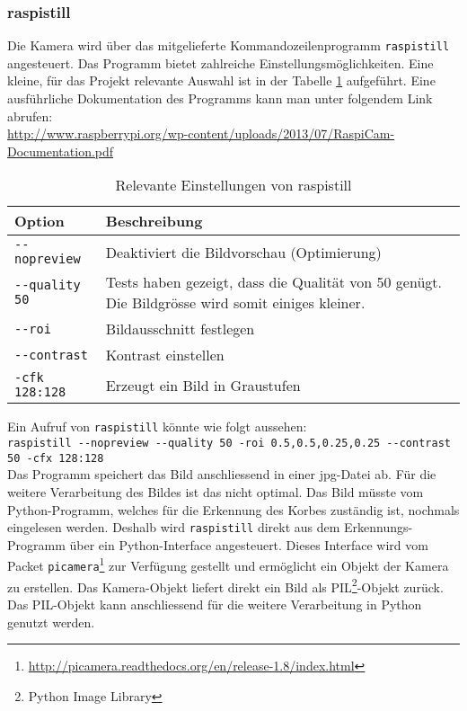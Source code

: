 \subsubsection{raspistill}
\label{subsub:raspistill}
Die Kamera wird über das mitgelieferte Kommandozeilenprogramm \verb|raspistill| angesteuert. Das Programm bietet zahlreiche Einstellungsmöglichkeiten. Eine kleine, für das Projekt relevante Auswahl ist in der Tabelle \ref{tab:raspistill} aufgeführt. Eine ausführliche Dokumentation des Programms kann man unter folgendem Link abrufen: \\

\href{http://www.raspberrypi.org/wp-content/uploads/2013/07/RaspiCam-Documentation.pdf}{http://www.raspberrypi.org/wp-content/uploads/2013/07/RaspiCam-Documentation.pdf} \\

\begin{table}[h!]
	\renewcommand{\arraystretch}{1.5}
	\begin{tabular}{|l|p{14cm}|}
		\hline Option & Beschreibung \\ 
		\hline \verb|--nopreview| & Deaktiviert die Bildvorschau (Optimierung) \\ 
		\hline  \verb|--quality 50| & Tests haben gezeigt, dass die Qualität von 50 genügt. Die Bildgrösse wird somit einiges kleiner. \\ 
		\hline  \verb|--roi| & Bildausschnitt festlegen \\ 
		\hline  \verb|--contrast| & Kontrast einstellen \\ 
		\hline  \verb|-cfk 128:128| & Erzeugt ein Bild in Graustufen \\ 
		\hline 
	\end{tabular} 
	\caption{Relevante Einstellungen von raspistill}
	\label{tab:raspistill}
\end{table}

Ein Aufruf von \verb|raspistill| könnte wie folgt aussehen: \\

\verb|raspistill --nopreview --quality 50 -roi 0.5,0.5,0.25,0.25 --contrast 50 -cfx 128:128| \\

Das Programm speichert das Bild anschliessend in einer jpg-Datei ab. Für die weitere Verarbeitung des Bildes ist das nicht optimal. Das Bild müsste vom Python-Programm, welches für die Erkennung des Korbes zuständig ist, nochmals eingelesen werden. Deshalb wird \verb|raspistill| direkt aus dem Erkennungs-Programm über ein Python-Interface angesteuert. Dieses Interface wird vom Packet \verb|picamera|\footnote{\href{http://picamera.readthedocs.org/en/release-1.8/index.html}{http://picamera.readthedocs.org/en/release-1.8/index.html}} zur Verfügung gestellt und ermöglicht ein Objekt der Kamera zu erstellen. Das Kamera-Objekt liefert direkt ein Bild als PIL\footnote{Python Image Library}-Objekt zurück. Das PIL-Objekt kann anschliessend für die weitere Verarbeitung in Python genutzt werden.
